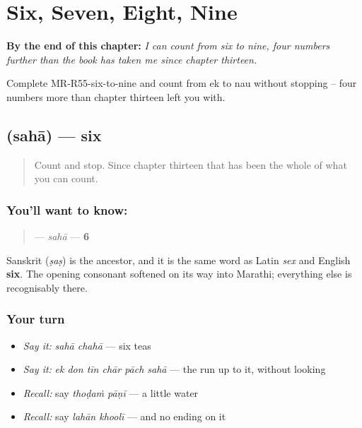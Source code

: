 
\chapter{Six, Seven, Eight, Nine}
\label{ch:mr-six-to-nine}

\begin{chapteropening}
\textbf{By the end of this chapter:} \emph{I can count from six to nine, four numbers further than the book has taken me since chapter thirteen.}

Complete MR-R55-six-to-nine and count from ek to nau without stopping -- four numbers more than chapter thirteen left you with.
\end{chapteropening}

\section[\texorpdfstring{\mr{सहा} (sahā)}{सहा (sahā)}]{ (sahā) — six}

\label{lesson:MR-C55-saha}



\begin{quote}
Count \textbf{    } and stop. Since chapter thirteen that has been the whole of what you can count.
\end{quote}

\subsection*{You'll want to know: }
\begin{quote}
\textbf{} — \emph{sahā} — \textbf{6}
\end{quote}

Sanskrit \textbf{} (\emph{ṣaṣ}) is the ancestor, and it is the same word as Latin \emph{sex} and English \textbf{six}. The opening consonant softened on its way into Marathi; everything else is recognisably there.

\subsection*{Your turn}
\begin{itemize}
\raggedright
  \item \emph{Say it:} \emph{sahā chahā} — six teas
  \item \emph{Say it:} \emph{ek don tīn chār pāch sahā} — the run up to it, without looking
  \item \emph{Recall:} say \emph{thoḍaṁ pāṇī} — a little water
  \item \emph{Recall:} say \emph{lahān khoolī} — and no ending on it
\end{itemize}

